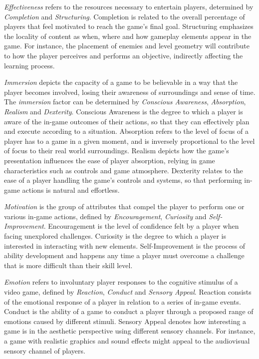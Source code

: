 \emph{Effectiveness} refers to the resources necessary to entertain players, determined by \emph{Completion} and \emph{Structuring}. Completion is related to the overall percentage of players that feel motivated to reach the game's final goal. Structuring emphasizes the locality of content as when, where and how gameplay elements appear in the game. For instance, the placement of enemies and level geometry will contribute to how the player perceives and performs an objective, indirectly affecting the learning process.

\emph{Immersion} depicts the capacity of a game to be believable in a way that the player becomes involved, losing their awareness of surroundings and sense of time. The \emph{immersion} factor can be determined by \emph{Conscious Awareness}, \emph{Absorption}, \emph{Realism} and \emph{Dexterity}. Conscious Awareness is the degree to which a player is aware of the in-game outcomes of their actions, so that they can effectively plan and execute according to a situation. Absorption refers to the level of focus of a player has to a game in a given moment, and is inversely proportional to the level of focus to their real world surroundings. Realism depicts how the game's presentation influences the ease of player absorption, relying in game characteristics such as controls and game atmosphere. Dexterity relates to the ease of a player handling the game's controls and systems, so that performing in-game actions is natural and effortless.

\emph{Motivation} is the group of attributes that compel the player to perform one or various in-game actions, defined by \emph{Encouragement}, \emph{Curiosity} and \emph{Self-Improvement}. Encouragement is the level of confidence felt by a player when facing unexplored challenges. Curiosity is the degree to which a player is interested in interacting with new elements. Self-Improvement is the process of ability development and happens any time a player must overcome a challenge that is more difficult than their skill level. 

\emph{Emotion} refers to involuntary player responses to the cognitive stimulus of a video game, defined by \emph{Reaction}, \emph{Conduct} and \emph{Sensory Appeal}. Reaction consists of the emotional response of a player in relation to a series of in-game events. Conduct is the ability of a game to conduct a player through a proposed range of emotions caused by different stimuli. Sensory Appeal denotes how interesting a game is in the aesthetic perspective using different sensory channels. For instance, a game with realistic graphics and sound effects might appeal to the audiovisual sensory channel of players.

